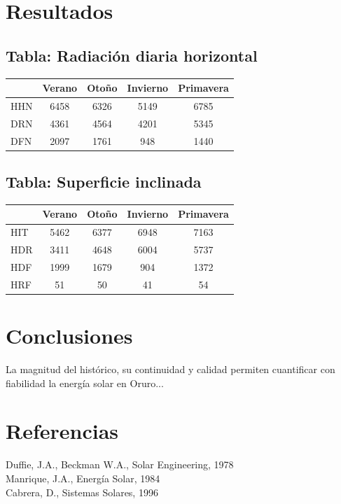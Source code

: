 \documentclass[12pt]{article}
\begin{document}
\section*{Resultados}

\subsection*{Tabla: Radiación diaria horizontal}
\begin{tabular}{lcccc}
\hline
 & Verano & Otoño & Invierno & Primavera \\
\hline
HHN & 6458 & 6326 & 5149 & 6785 \\
DRN & 4361 & 4564 & 4201 & 5345 \\
DFN & 2097 & 1761 & 948 & 1440 \\
\hline
\end{tabular}

\subsection*{Tabla: Superficie inclinada}
\begin{tabular}{lcccc}
\hline
 & Verano & Otoño & Invierno & Primavera \\
\hline
HIT & 5462 & 6377 & 6948 & 7163 \\
HDR & 3411 & 4648 & 6004 & 5737 \\
HDF & 1999 & 1679 & 904 & 1372 \\
HRF & 51 & 50 & 41 & 54 \\
\hline
\end{tabular}

\section*{Conclusiones}
La magnitud del histórico, su continuidad y calidad permiten cuantificar con fiabilidad la energía solar en Oruro...

\section*{Referencias}
Duffie, J.A., Beckman W.A., Solar Engineering, 1978 \\
Manrique, J.A., Energía Solar, 1984 \\
Cabrera, D., Sistemas Solares, 1996
\end{document}
